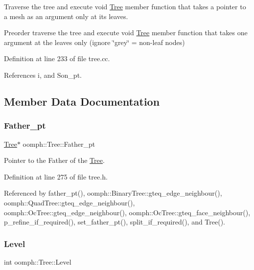 Traverse the tree and execute void \hyperlink{classoomph_1_1Tree}{Tree} member function that takes a pointer to a mesh as an argument only at its leaves. 

Preorder traverse the tree and execute void \hyperlink{classoomph_1_1Tree}{Tree} member function that takes one argument at the leaves only (ignore \char`\"{}grey\char`\"{} = non-\/leaf nodes) 

Definition at line 233 of file tree.\+cc.



References i, and Son\+\_\+pt.



\subsection{Member Data Documentation}
\mbox{\label{classoomph_1_1Tree_a001ce5515a3d76cdad248695e149504b}} 
\subsubsection{\texorpdfstring{Father\+\_\+pt}{Father\_pt}}
{\footnotesize\ttfamily \hyperlink{classoomph_1_1Tree}{Tree}$\ast$ oomph\+::\+Tree\+::\+Father\+\_\+pt\hspace{0.3cm}{\ttfamily [protected]}}



Pointer to the Father of the \hyperlink{classoomph_1_1Tree}{Tree}. 



Definition at line 275 of file tree.\+h.



Referenced by father\+\_\+pt(), oomph\+::\+Binary\+Tree\+::gteq\+\_\+edge\+\_\+neighbour(), oomph\+::\+Quad\+Tree\+::gteq\+\_\+edge\+\_\+neighbour(), oomph\+::\+Oc\+Tree\+::gteq\+\_\+edge\+\_\+neighbour(), oomph\+::\+Oc\+Tree\+::gteq\+\_\+face\+\_\+neighbour(), p\+\_\+refine\+\_\+if\+\_\+required(), set\+\_\+father\+\_\+pt(), split\+\_\+if\+\_\+required(), and Tree().

\mbox{\label{classoomph_1_1Tree_a9ac30decb7a63027906880620f8b98ee}} 
\subsubsection{\texorpdfstring{Level}{Level}}
{\footnotesize\ttfamily int oomph\+::\+Tree\+::\+Level\hspace{0.3cm}{\ttfamily [protected]}}



